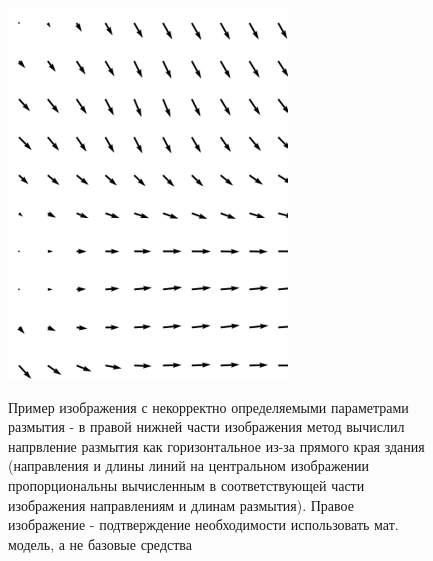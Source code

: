 \begin{figure} [H]
\begin{minipage}[h]{0.28\linewidth}
\includegraphics[width=1\linewidth, right]{pics/fields/vec.png} \\ 
\end{minipage}
\caption{Пример изображения с некорректно определяемыми параметрами размытия - в правой нижней части изображения метод вычислил напрвление размытия как горизонтальное из-за прямого края здания (направления и длины линий на центральном изображении пропорциональны вычисленным в соответствующей части изображения направлениям и длинам размытия). Правое изображение - подтверждение необходимости использовать мат. модель, а не базовые средства }
\label{ris:bad_interpolation}
\end{figure}

